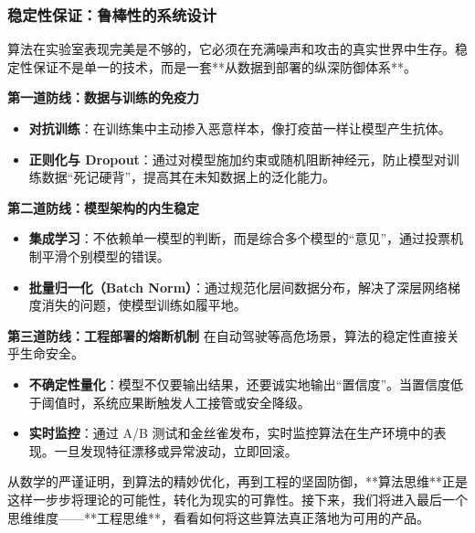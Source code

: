 \subsubsection{稳定性保证：鲁棒性的系统设计}

算法在实验室表现完美是不够的，它必须在充满噪声和攻击的真实世界中生存。稳定性保证不是单一的技术，而是一套**从数据到部署的纵深防御体系**。

\textbf{第一道防线：数据与训练的免疫力}
\begin{itemize}
    \item \textbf{对抗训练}：在训练集中主动掺入恶意样本，像打疫苗一样让模型产生抗体。
    \item \textbf{正则化与 Dropout}：通过对模型施加约束或随机阻断神经元，防止模型对训练数据“死记硬背”，提高其在未知数据上的泛化能力。
\end{itemize}

\textbf{第二道防线：模型架构的内生稳定}
\begin{itemize}
    \item \textbf{集成学习}：不依赖单一模型的判断，而是综合多个模型的“意见”，通过投票机制平滑个别模型的错误。
    \item \textbf{批量归一化（Batch Norm）}：通过规范化层间数据分布，解决了深层网络梯度消失的问题，使模型训练如履平地。
\end{itemize}

\textbf{第三道防线：工程部署的熔断机制}
在自动驾驶等高危场景，算法的稳定性直接关乎生命安全。
\begin{itemize}
    \item \textbf{不确定性量化}：模型不仅要输出结果，还要诚实地输出“置信度”。当置信度低于阈值时，系统应果断触发人工接管或安全降级。
    \item \textbf{实时监控}：通过 A/B 测试和金丝雀发布，实时监控算法在生产环境中的表现。一旦发现特征漂移或异常波动，立即回滚。
\end{itemize}

从数学的严谨证明，到算法的精妙优化，再到工程的坚固防御，**算法思维**正是这样一步步将理论的可能性，转化为现实的可靠性。接下来，我们将进入最后一个思维维度——**工程思维**，看看如何将这些算法真正落地为可用的产品。